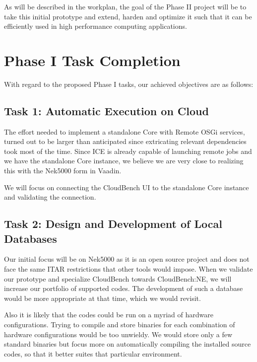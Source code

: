 As will be described in the workplan, the goal of the Phase II project will be to take this initial prototype and extend, harden and 
optimize it such that it can be efficiently used in high performance computing applications. 







\section{Phase I Task Completion}
With regard to the proposed Phase I tasks, our achieved objectives are as 
follows:

\subsection{Task 1: Automatic Execution on Cloud}
The effort needed to implement a standalone Core with Remote OSGi services, 
turned out to be larger than anticipated since extricating relevant 
dependencies took most of the time. Since ICE is already capable of launching 
remote jobs and we have the standalone Core instance, we believe we are very 
close to realizing this with the Nek5000 form in Vaadin.

We will focus on connecting the CloudBench UI to the standalone Core instance 
and validating the connection.

\subsection{Task 2: Design and Development of Local Databases}
Our initial focus will be on Nek5000 as it is an open source project and does 
not face the same ITAR restrictions that other tools would impose. When we 
validate our prototype and specialize CloudBench towards CloudBench:NE, we will 
increase our portfolio of supported codes. The development of such a database 
would be more appropriate at that time, which we would revisit.

Also it is likely that the codes could be run on a myriad of hardware 
configurations. Trying to compile and store binaries for each combination of 
hardware configurations would be too unwieldy. We would store only a few 
standard binaries but focus more on automatically compiling the installed 
source codes, so that it better suites that particular environment.

